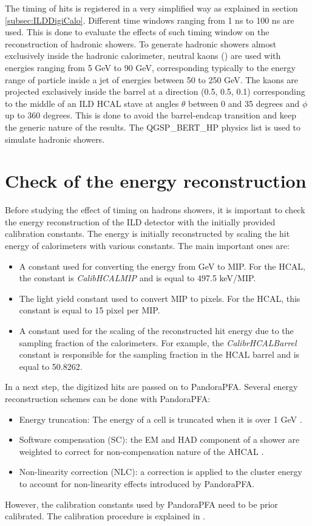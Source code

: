\label{sec:ILDTiming}

The timing of hits is registered in a very simplified way as explained in section \ref{subsec:ILDDigiCalo}. Different time windows ranging from 1 ns to 100 ns are used. This is done to evaluate the effects of such timing window on the reconstruction of hadronic showers. To generate hadronic showers almost exclusively inside the hadronic calorimeter, neutral kaons (\kzeroL{}) are used with energies ranging from 5 GeV to 90 GeV, corresponding typically to the energy range of particle inside a jet of energies between 50 to 250 GeV. The kaons are projected exclusively inside the barrel at a direction (0.5, 0.5, 0.1) corresponding to the middle of an ILD HCAL stave at angles $\theta$ between 0 and 35 degrees and $\phi$ up to 360 degrees. This is done to avoid the barrel-endcap transition and keep the generic nature of the results. The QGSP\_BERT\_HP physics list is used to simulate hadronic showers.

\section{Check of the energy reconstruction}

Before studying the effect of timing on hadrons showers, it is important to check the energy reconstruction of the ILD detector with the initially provided calibration constants. The energy is initially reconstructed by scaling the hit energy of calorimeters with various constants. The main important ones are:
\begin{itemize}
  \item A constant used for converting the energy from GeV to MIP. For the HCAL, the constant is \textit{CalibHCALMIP} and is equal to 497.5 keV/MIP.
  \item The light yield constant used to convert MIP to pixels. For the HCAL, this constant is equal to 15 pixel per MIP.
  \item A constant used for the scaling of the reconstructed hit energy due to the sampling fraction of the calorimeters. For example, the \textit{CalibrHCALBarrel} constant is responsible for the sampling fraction in the HCAL barrel and is equal to 50.8262.
\end{itemize}

In a next step, the digitized hits are passed on to PandoraPFA. Several energy reconstruction schemes can be done with PandoraPFA:
\begin{itemize}
  \item Energy truncation: The energy of a cell is truncated when it is over 1 GeV \cite{Tran:2017tgr}.
  \item Software compensation (SC): the EM and HAD component of a shower are weighted to correct for non-compensation nature of the AHCAL \cite{Tran:2017tgr}.
  \item Non-linearity correction (NLC): a correction is applied to the cluster energy to account for non-linearity effects introduced by PandoraPFA.
\end{itemize}
However, the calibration constants used by PandoraPFA need to be prior calibrated. The calibration procedure is explained in \cite{PandoraCalib}.

